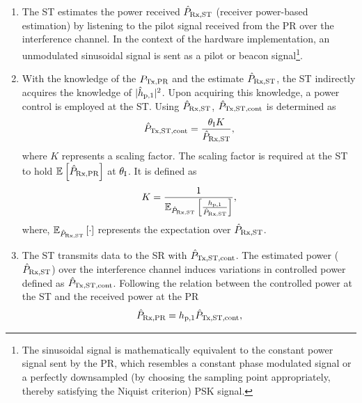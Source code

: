 \begin{enumerate}
	\item The ST estimates the power received $\hat{P}_{\text{Rx,ST}}$ (receiver power-based estimation) by listening to the pilot signal received from the PR over the interference channel. In the context of the hardware implementation, an unmodulated sinusoidal signal is sent as a pilot or beacon signal\footnote{The sinusoidal signal is mathematically equivalent to the constant power signal sent by the PR, which resembles a constant phase modulated signal or a perfectly downsampled (by choosing the sampling point appropriately, thereby satisfying the Niquist criterion) PSK signal.}.
	\item With the knowledge of the $P_{\text{Tx,PR}}$ and the estimate $\hat{P}_{\text{Rx,ST}}$, the ST indirectly acquires the knowledge of $|\hat{h}_{\text{p,1}}|^2$. 
	Upon acquiring this knowledge, a power control is employed at the ST. Using $\hat{P}_{\text{Rx,ST}}$, $\hat{P}_{\text{Tx,ST,cont}}$ is determined as 
\begin{align}
\hat{P}_{\text{Tx,ST,cont}} = \frac{\theta_{\text{I}} K}{\hat{P}_{\text{Rx,ST}}}, \label{eq:preg} 
\end{align}
where $K$ represents a scaling factor. The scaling factor is required at the ST to hold ${\mathbb E}_{}\left[ \hat{P}_{\text{Rx,PR}} \right]$ at $\theta_{\text{I}}$. It is defined as
\begin{align}
K = \frac{1}{ {\mathbb E}_{\hat{P}_{\text{Rx,ST}}}\left[ \frac{h_{\text{p,1}}}{\hat{P}_{\text{Rx,ST}}} \right]}, \label{eq:sca} 
\end{align}
where, ${\mathbb E}_{\hat{P}_{\text{Rx,ST}}}\left[ \cdot \right]$ represents the expectation over $\hat{P}_{\text{Rx,ST}}$.
	\item The ST transmits data to the SR with $\hat{P}_{\text{Tx,ST,cont}}$. 
	The estimated power ($\hat{P}_{\text{Rx,ST}}$) over the interference channel induces variations in controlled power defined as $\hat{P}_{\text{Tx,ST,cont}}$. Following the relation between the controlled power at the ST and the received power at the PR 
\begin{align}
\hat{P}_{\text{Rx,PR}}  = h_{\text{p,1}} \hat{P}_{\text{Tx,ST,cont}},
\label{eq:eprcvdpr}
\end{align}

\end{enumerate}
